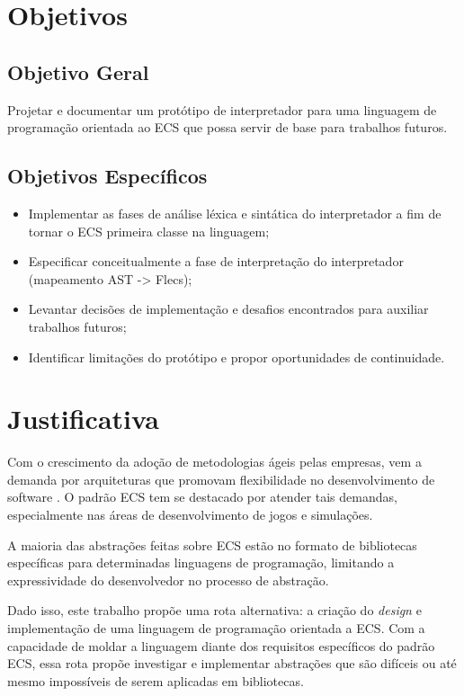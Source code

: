 \section{Objetivos} \label{sec:objetivos}

\subsection{Objetivo Geral} \label{sec:obj_geral}

Projetar e documentar um protótipo de interpretador para uma linguagem de programação orientada ao ECS que possa servir de base para trabalhos futuros.

\subsection{Objetivos Específicos}

\begin{itemize}
    \item Implementar as fases de análise léxica e sintática do interpretador a fim de tornar o ECS primeira classe na linguagem;
    \item Especificar conceitualmente a fase de interpretação do interpretador (mapeamento AST -> Flecs);
    \item Levantar decisões de implementação e desafios encontrados para auxiliar trabalhos futuros;
    \item Identificar limitações do protótipo e propor oportunidades de continuidade.
\end{itemize}

\section{Justificativa} \label{sec:justificativa}

Com o crescimento da adoção de metodologias ágeis pelas empresas, vem a demanda por arquiteturas que promovam flexibilidade no desenvolvimento de software \cite{flightdynamics}. O padrão ECS tem se destacado por atender tais demandas, especialmente nas áreas de desenvolvimento de jogos e simulações.

A maioria das abstrações feitas sobre ECS estão no formato de bibliotecas específicas para determinadas linguagens de programação, limitando a expressividade do desenvolvedor no processo de abstração.

Dado isso, este trabalho propõe uma rota alternativa: a criação do \textit{design} e implementação de uma linguagem de programação orientada a ECS. Com a capacidade de moldar a linguagem diante dos requisitos específicos do padrão ECS, essa rota propõe investigar e implementar abstrações que são difíceis ou até mesmo impossíveis de serem aplicadas em bibliotecas.
